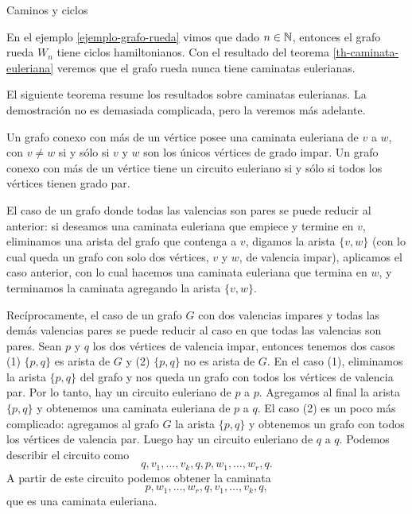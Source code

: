 \begin{section}{Caminos y ciclos}
\begin{ejemplo*}
    En  el ejemplo \ref{ejemplo-grafo-rueda} vimos que dado $n \in {\mathbb N}$, entonces el grafo rueda $W_n$ tiene ciclos hamiltonianos. Con el resultado del teorema \ref{th-caminata-euleriana} veremos que  el grafo rueda nunca tiene caminatas eulerianas. 
\end{ejemplo*}

El siguiente teorema resume los resultados sobre caminatas eulerianas. La demostración no es demasiada complicada, pero la veremos más adelante.  

\begin{teorema}\label{th-caminata-euleriana} Un grafo conexo con más de un vértice posee una caminata euleriana de $v$ a $w$, con $v \not= w$ si y sólo si $v$ y $w$ son los únicos vértices de grado impar. Un grafo conexo con más de un vértice tiene un circuito euleriano si y sólo si todos los vértices tienen grado par.
\end{teorema}

\begin{observacion}\label{obs-par-a-impar}
    El caso de un grafo donde todas las valencias son pares se puede reducir al anterior: si deseamos una caminata euleriana que empiece y termine en $v$, eliminamos una arista del grafo que contenga a $v$, digamos la arista $\{v,w\}$ (con lo cual queda un grafo  con solo dos vértices, $v$ y $w$, de valencia impar), aplicamos el caso  anterior, con lo cual hacemos una caminata euleriana que termina en  $w$, y terminamos la caminata agregando  la arista $\{v,w\}$. 
\end{observacion}

\begin{observacion}\label{obs-impar-a-par}
    Recíprocamente,  el caso de un grafo  $G$ con dos valencias impares y todas las demás valencias pares  se puede reducir al caso en que todas las valencias son pares. Sean $p$ y $q$ los dos vértices de valencia impar,  entonces tenemos dos casos (1) $\{p,q\}$  es arista de $G$ y (2) $\{p,q\}$  no es arista de $G$.  En el caso (1),  eliminamos la arista  $\{p,q\}$  del grafo  y  nos queda un grafo  con todos los vértices de valencia par. Por lo tanto, hay un circuito euleriano de $p$  a $p$. Agregamos al final la arista $\{p,q\}$  y obtenemos una caminata euleriana de  $p$ a $q$. El caso (2) es un poco más complicado: agregamos al grafo $G$ la arista $\{p,q\}$ y obtenemos un grafo  con todos los vértices de valencia par. Luego  hay un circuito euleriano de $q$ a $q$. Podemos describir el circuito como
    $$
    q,v_1,\ldots,v_k,q,p,w_1,\ldots,w_r,q.
    $$
    A partir de este circuito podemos obtener la caminata
    $$
    p,w_1,\ldots,w_r,q,v_1,\ldots,v_k,q, 
    $$
    que es una caminata euleriana. 
\end{observacion}


\end{section}
